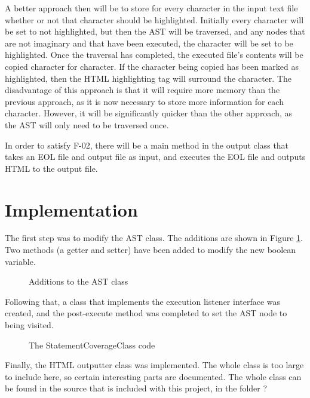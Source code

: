 A better approach then will be to store for every character in the input text file whether or not that character should be highlighted. Initially every character will be set to not highlighted, but then the AST will be traversed, and any nodes that are not imaginary and that have been executed, the character will be set to be highlighted. Once the traversal has completed, the executed file's contents will be copied character for character. If the character being copied has been marked as highlighted, then the HTML highlighting tag will surround the character. The disadvantage of this approach is that it will require more memory than the previous approach, as it is now necessary to store more information for each character. However, it will be significantly quicker than the other approach, as the AST will only need to be traversed once.

In order to satisfy F-02, there will be a main method in the output class that takes an EOL file and output file as input, and executes the EOL file and outputs HTML to the output file.

\section{Implementation}

The first step was to modify the AST class. The additions are shown in Figure \ref{lst:ASTStatementAdditions}. Two methods (a getter and setter) have been added to modify the new boolean variable.

\begin{figure}[h]
	
	\caption{Additions to the AST class}
	\label{lst:ASTStatementAdditions}
\end{figure}

Following that, a class that implements the execution listener interface was created, and the post-execute method was completed to set the AST node to being visited.

\begin{figure}[h]
	
	\caption{The StatementCoverageClass code}
	\label{lst:StatementCoverageListener}
\end{figure}

Finally, the HTML outputter class was implemented. The whole class is too large to include here, so certain interesting parts are documented. The whole class can be found in the source that is included with this project, in the folder ?

